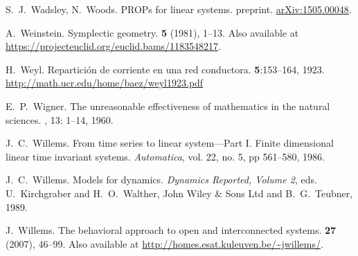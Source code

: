 \begin{thebibliography}{RSW00}



     S.\ J.\ Wadsley, N.\ Woods. 
    \newblock PROPs for linear systems.
    \newblock preprint. 
    \newblock \href{http://arxiv.org/abs/1505.00048}{arXiv:1505.00048}.

    A.\ Weinstein.
    \newblock Symplectic geometry.
     {\bf 5} (1981), 1--13.
    \newblock Also available at 	
    \href{https://projecteuclid.org/euclid.bams/1183548217}
    {https://projecteuclid.org/euclid.bams/1183548217}.

    H.\ Weyl.
    \newblock Repartici\'on de corriente en una red conductora.
     {\bf 5}:153--164, 1923.
    \newblock \href{http://math.ucr.edu/home/baez/weyl1923.pdf}{http://math.ucr.edu/home/baez/weyl1923.pdf}


    E.\ P.\ Wigner.
    \newblock The unreasonable effectiveness of mathematics in the natural
    sciences.
    , 13: 1–14,
    1960.

    J.\ C.\ Willems.
    \newblock From time series to linear system---Part I.
    Finite dimensional linear time invariant systems.
    \newblock \emph{Automatica}, vol.  22, no. 5, pp 561--580, 1986. 

    J.\ C.\ Willems.
    \newblock Models for dynamics.
    \newblock \emph{Dynamics Reported,
    Volume 2}, eds. U.\ Kirchgraber and H.\ O.\ Walther, John Wiley \& Sons
    Ltd and B.\ G.\ Teubner, 1989.

    J.\ Willems.
    \newblock The behavioral approach to open and interconnected
    systems.
     {\bf 27} (2007), 46--99.
    \newblock Also available at
    \href{http://homes.esat.kuleuven.be/~jwillems/}  
    {http://homes.esat.kuleuven.be/\~{}jwillems/}.


\end{thebibliography}
